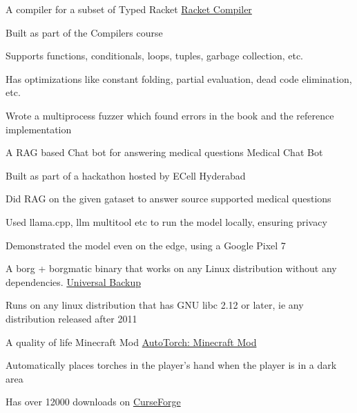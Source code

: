 
\begin{cventries}
    
    \cventry
    {A compiler for a subset of Typed Racket} %
    {\href{https://github.com/necessary129/diesun}{Racket Compiler}} %
    {} %
    {} %
    {
      \begin{cvitems} %
        \item {Built as part of the Compilers course}
        \item {Supports functions, conditionals, loops, tuples, garbage collection, etc.}
        \item {Has optimizations like constant folding, partial evaluation, dead code elimination, etc.}
        \item {Wrote a multiprocess fuzzer which found errors in the book and the reference implementation}
      \end{cvitems}
    }
    
    \cventry
    {A RAG based Chat bot for answering medical questions} %
    {Medical Chat Bot} %
    {} %
    {} %
    {
      \begin{cvitems} %
        \item {Built as part of a hackathon hosted by ECell Hyderabad}
        \item {Did RAG on the given gataset to answer source supported medical questions}
        \item {Used llama.cpp, llm multitool etc to run the model locally, ensuring privacy}
        \item {Demonstrated the model even on the edge, using a Google Pixel 7}
      \end{cvitems}
    }
    
    \cventry
    {A borg + borgmatic binary that works on any Linux distribution without any dependencies.} %
    {\href{https://github.com/necessary129/the-universal-borgmatic}{Universal Backup}} %
    {} %
    {} %
    {
      \begin{cvitems} %
        \item {Runs on any linux distribution that has GNU libc 2.12 or later, ie any distribution released after 2011}
      \end{cvitems}
    }
    
    \cventry
    {A quality of life Minecraft Mod} %
    {\href{https://www.curseforge.com/minecraft/mc-mods/auto-torch}{AutoTorch: Minecraft Mod}} %
    {} %
    {} %
    {
      \begin{cvitems} %
        \item {Automatically places torches in the player's hand when the player is in a dark area}
        \item {Has over 12000 downloads on \href{https://www.curseforge.com/minecraft/mc-mods/auto-torch}{CurseForge}}
    \end{cvitems}
    }
    

\end{cventries}
